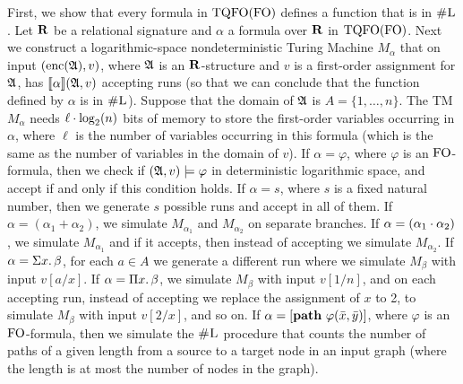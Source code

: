 
First, we show that every formula in ${\rm TQFO}({\rm FO})$ defines a function that is in $\text{\sc \#L}$.
Let $\mathbf{R}$ be a relational signature and $\alpha$ a formula over $\mathbf{R}$ in ${\rm TQFO}({\rm FO})$. Next we construct a logarithmic-space nondeterministic Turing Machine $M_{\alpha}$ that on input $({\rm enc}(\mathfrak{A}),v)$, where $\mathfrak{A}$ is an $\mathbf{R}$-structure and $v$ is a first-order assignment for $\mathfrak{A}$, has ${\llbracket{}{\alpha}\rrbracket}(\mathfrak{A},v)$ accepting runs (so that we can conclude that the function defined by $\alpha$ is in $\text{\sc \#L}$). Suppose that the domain of $\mathfrak{A}$ is $A = \{1,\ldots,n\}$. The TM $M_{\alpha}$ needs $\ell \cdot\log_2(n)$ bits of memory to store the first-order variables occurring in $\alpha$, where $\ell$ is the number of variables occurring in this formula (which is the same as the number of variables in the domain of $v$). If $\alpha = \varphi$, where $\varphi$ is an ${\rm FO}$-formula, then we check if $(\mathfrak{A},v)\models\varphi$ in deterministic logarithmic space, and accept if and only if this condition holds. If $\alpha = s$, where $s$ is a fixed natural number, then we generate $s$ possible runs and accept in all of them. If $\alpha = (\alpha_1 + \alpha_2)$, we simulate $M_{\alpha_1}$ and $M_{\alpha_2}$ on separate branches. If $\alpha = (\alpha_1\cdot\alpha_2)$, we simulate $M_{\alpha_1}$ and if it accepts, then instead of accepting we simulate $M_{\alpha_2}$. If $\alpha = \Sigma{x}.\,\beta$, for each $a\in A$ we generate a different run where we simulate $M_{\beta}$ with input $v[a/x]$. If $\alpha = \Pi{x}.\,\beta$, we simulate $M_{\beta}$ with input $v[1/n]$, and on each accepting run, instead of accepting we replace the assignment of $x$ to 2, to simulate $M_{\beta}$ with input $v[2/x]$, and so on. If $\alpha = [{\bf path} \,\, \varphi(\bar{x},\bar{y})]$, where $\varphi$ is an ${\rm FO}$-formula, then we simulate the $\text{\sc \#L}$ procedure that counts the number of paths of a given length from a source to a target node in an input graph (where the length is at most the number of nodes in the graph).

